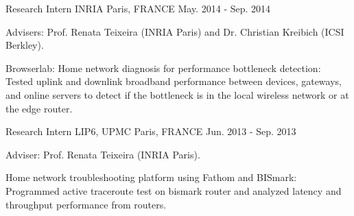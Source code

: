 \begin{cventries}
{\begin{cvitems}
{     		}
      \end{cvitems}
    }

  \cventry
    {Research Intern} %
    {INRIA} %
    {Paris, FRANCE} %
    {May. 2014 - Sep. 2014} %
    {
      \begin{cvitems} %
      \item {Advisers: Prof. Renata Teixeira (INRIA Paris) and Dr. Christian Kreibich (ICSI Berkley).}
%      
      \item {Browserlab: Home network diagnosis for performance bottleneck detection: Tested uplink and downlink broadband performance between devices, gateways, and online servers to detect if the bottleneck is in the local wireless network or at the edge router.}
%      
      \end{cvitems}
    }
    
  \cventry
    {Research Intern} %
    {LIP6, UPMC} %
    {Paris, FRANCE} %
    {Jun. 2013 - Sep. 2013} %
    {
      \begin{cvitems} %
      \item {Adviser: Prof. Renata Teixeira (INRIA Paris).}
%      
      \item {Home network troubleshooting platform using Fathom and BISmark: Programmed active traceroute test on bismark router and analyzed latency and throughput performance from routers.}
%      
      \end{cvitems}
    }


\end{cventries}
